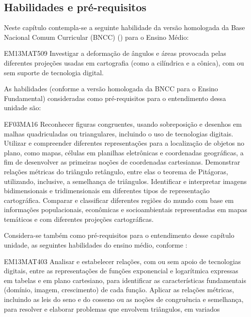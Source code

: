 \mainmatter

\begin{apresentacao}
{
\section*{Habilidades e pré-requisitos}

Neste capítulo contempla-se a seguinte habilidade da versão homologada da Base Nacional Comum Curricular (BNCC) (\cite{BNCC2018}) para o Ensino Médio:

\begin{habilities}{EM13MAT509}
Investigar a deformação de ângulos e áreas provocada pelas diferentes projeções usadas em cartografia (como a cilíndrica e a cônica), com ou sem suporte de tecnologia digital.
\end{habilities}

 
As habilidades (conforme a versão homologada da BNCC para o Ensino Fundamental) consideradas como pré-requisitos para o entendimento dessa unidade são:

\begin{habilities}{EF03MA16}
Reconhecer figuras congruentes, usando sobreposição e desenhos em malhas quadriculadas ou triangulares, incluindo o uso de tecnologias digitais.
 Utilizar e compreender diferentes representações para a localização de objetos no plano, como mapas, células em planilhas eletrônicas e coordenadas geográficas, a fim de desenvolver as primeiras noções de coordenadas cartesianas.
 Demonstrar relações métricas do triângulo retângulo, entre elas o teorema de Pitágoras, utilizando, inclusive, a semelhança de triângulos.
Identificar e interpretar imagens bidimensionais e tridimensionais em diferentes tipos de representação cartográfica.
Comparar e classificar diferentes regiões do mundo com base em informações populacionais, econômicas e socioambientais representadas em mapas temáticos e com diferentes projeções cartográficas.
\end{habilities}


Considera-se também como pré-requisitos para o entendimento desse capítulo unidade, as seguintes habilidades do ensino médio, conforme \cite{BNCC2018}:
\begin{habilities}{EM13MAT403}
Analisar e estabelecer relações, com ou sem apoio de tecnologias digitais, entre as representações de funções exponencial e logarítmica expressas em tabelas e em plano cartesiano, para identificar as características fundamentais (domínio, imagem, crescimento) de cada função.
  Aplicar as relações métricas, incluindo as leis do seno e do cosseno ou as noções de congruência e semelhança, para resolver e elaborar problemas que envolvem triângulos, em variados 
\end{habilities}

}
\end{apresentacao}
